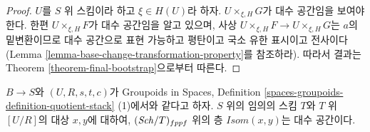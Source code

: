 \begin{proof}
$U$를 $S$ 위 스킴이라 하고 $\xi \in H(U)$라 하자.
$U \times_{\xi, H} G$가 대수 공간임을 보여야 한다.
한편 $U \times_{\xi, H} F$가 대수 공간임을 알고 있으며,
사상
$U \times_{\xi, H} F \to U \times_{\xi, H} G$는 $a$의 밑변환이므로
대수 공간으로 표현 가능하고 평탄이고 국소 유한 표시이고 전사이다
(Lemma \ref{lemma-base-change-transformation-property}를 참조하라).
따라서 결과는 Theorem \ref{theorem-final-bootstrap}으로부터 따른다.
\end{proof}

\begin{lemma}
\label{lemma-quotient-stack-isom}
$B \to S$와 $(U, R, s, t, c)$가 Groupoids in Spaces,
Definition \ref{spaces-groupoids-definition-quotient-stack} (1)에서와
같다고 하자. $S$ 위의 임의의 스킴 $T$와 $T$ 위 $[U/R]$의 대상
$x, y$에 대하여, $(\mathit{Sch}/T)_{fppf}$ 위의 층
$\mathit{Isom}(x, y)$는 대수 공간이다.
\end{lemma}

